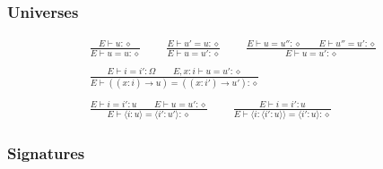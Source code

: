 \documentclass[twoside]{article}
\begin{document}
\subsubsection*{Universes \hfill
{}
}

\begin{displaymath}
\begin{array}{c}
\displaystyle
\frac{
E \vdash u : \diamond
}{
E \vdash u = u : \diamond
}
\qquad
\frac{
E \vdash u' = u : \diamond
}{
E \vdash u = u' : \diamond
}
\qquad
\frac{
E \vdash u = u'' : \diamond
\qquad
E \vdash u'' = u' : \diamond
}{
E \vdash u = u' : \diamond
}
\\\\\displaystyle
\frac{
E \vdash i = i' : \Omega
\qquad
E,x:i \vdash u = u' : \diamond
}{
E \vdash ((x:i)\to u) = ((x:i')\to u') : \diamond
}
\\\\\displaystyle
\frac{
E \vdash i = i' : u
\qquad
E \vdash u = u' : \diamond
}{
E \vdash \langle i:u\rangle = \langle i':u'\rangle : \diamond
}
\qquad
\frac{
E \vdash i = i' : u
}{
E \vdash \langle i:\langle i':u\rangle\rangle = \langle i':u\rangle : \diamond
}
\end{array}
\end{displaymath}



\subsubsection*{Signatures \hfill
{}
}
\end{document}
